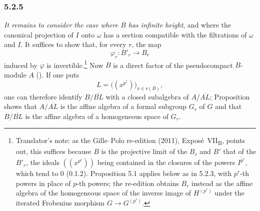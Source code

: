 
\subsubsection*{5.2.5}
\label{sga3:VIIB:5.2.5}

\emph{It remains to consider the case where \(B\) has infinite height},
and where the canonical projection of \(I\) onto \(\omega\) has a
section compatible with the filtrations of \(\omega\) and \(I\). It
suffices to show that, for every \(r\), the map
\[
  \varphi_r:B'_r\longrightarrow B_r
\]
induced by \(\varphi\) is invertible.\footnote{Translator's note: as the Gille--Polo re-edition (2011),
Expos\'e~VII\textsubscript{B}, points out, this suffices because \(B\) is the projective limit of the \(B_r\)
and \(B'\) that of the \(B'_r\), the ideals \(((x^{p^r}))\) being contained in the closures of the powers
\(\overline{I^{p^r}}\), which tend to \(0\) (0.1.2). Proposition 5.1 applies below as in 5.2.3, with
\(p^r\)-th powers in place of \(p\)-th powers; the re-edition obtains \(B_r\) instead as the affine algebra of
the homogeneous space of the inverse image of \(H^{(p^r)}\) under the iterated Frobenius morphism
\(G\to G^{(p^r)}\).} Now \(B\) is a direct factor of
the pseudocompact \(B\)-module \(A\) \textup{()}. If one puts
\[
  L=\bigl((x^{p^r})\bigr)_{x\in\mathfrak r(B)},
\]
one can therefore identify \(B/\overline{BL}\) with a closed subalgebra
of \(A/\overline{AL}\); Proposition  shows that
\(A/\overline{AL}\) is the affine algebra of a formal subgroup \(G_r\)
of \(G\) and that \(B/\overline{BL}\) is the affine algebra of a
homogeneous space of \(G_r\).

